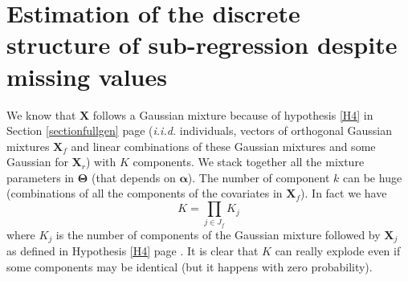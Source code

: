 \documentclass[12pt,a4paper]{report}
\begin{document}
\section{Estimation of the discrete structure of sub-regression despite missing values}\label{nbcomp}
	We know that $\boldsymbol{X}$ follows a Gaussian mixture because of hypothesis \ref{H4} in Section \ref{sectionfullgen} page \pageref{H4} ({\it i.i.d.} individuals, vectors of orthogonal Gaussian mixtures $\boldsymbol{X}_f$ and linear combinations of these Gaussian mixtures and some Gaussian for $\boldsymbol{X}_r$) with $K$ components. 
	We stack together all the mixture parameters %
	in $\boldsymbol{\Theta}$ (that depends on $\boldsymbol{\alpha}$). %
	The number of component $k$ can be huge (combinations of all the components of the covariates in $\boldsymbol{X}_f$). In fact we have 
	\begin{equation}
		K=\prod_{j\in J_f}K_j  \nonumber 
	\end{equation}
	where $K_j$ is the number of components of the Gaussian mixture followed by $\boldsymbol{X}_j$ as defined in Hypothesis \ref{H4} page \pageref{H4}. It is clear that $K$ can really explode even if some components may be identical (but it happens with zero probability).
	
\end{document}
